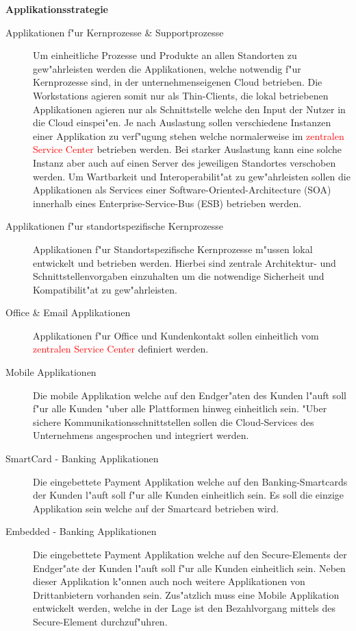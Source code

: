 \textbf{Applikationsstrategie}\\	

\begin{description}
	
	\item[Applikationen f"ur Kernprozesse \& Supportprozesse] Um einheitliche Prozesse und Produkte an allen Standorten zu gew"ahrleisten werden die Applikationen, welche notwendig f"ur Kernprozesse sind, in der unternehmenseigenen Cloud betrieben. Die Workstations agieren somit nur als Thin-Clients, die lokal betriebenen Applikationen agieren nur als Schnittstelle welche den Input der Nutzer in die Cloud einspei"en. Je nach Auslastung sollen verschiedene Instanzen einer Applikation zu verf"ugung stehen welche normalerweise im \textcolor{red}{zentralen Service Center} betrieben werden. Bei starker Auslastung kann eine solche Instanz aber auch auf einen Server des jeweiligen Standortes verschoben werden. Um Wartbarkeit und Interoperabilit"at zu gew"ahrleisten sollen die Applikationen als Services einer Software-Oriented-Architecture (SOA) innerhalb eines Enterprise-Service-Bus (ESB) betrieben werden. 
	 
	\item[Applikationen f"ur standortspezifische Kernprozesse] Applikationen f"ur Standortspezifische Kernprozesse m"ussen lokal entwickelt und betrieben werden. Hierbei sind zentrale Architektur- und Schnittstellenvorgaben einzuhalten um die notwendige Sicherheit und Kompatibilit"at zu gew"ahrleisten. 	
	
	\item[Office \& Email Applikationen] Applikationen f"ur Office und Kundenkontakt sollen einheitlich vom \textcolor{red}{zentralen Service Center} definiert werden.
	
	\item[Mobile Applikationen] Die mobile Applikation welche auf den Endger"aten des Kunden l"auft soll f"ur alle Kunden "uber alle Plattformen hinweg einheitlich sein. "Uber sichere Kommunikationsschnittstellen sollen die Cloud-Services des Unternehmens angesprochen und integriert werden.
	
	\item[SmartCard - Banking Applikationen] Die eingebettete Payment Applikation welche auf den Banking-Smartcards der Kunden l"auft soll f"ur alle Kunden einheitlich sein. Es soll die einzige Applikation sein welche auf der Smartcard betrieben wird.
	
	\item[Embedded - Banking Applikationen] Die eingebettete Payment Applikation welche auf den Secure-Elements der Endger"ate der Kunden l"auft soll f"ur alle Kunden einheitlich sein. Neben dieser Applikation k"onnen auch noch weitere Applikationen von Drittanbietern vorhanden sein. Zus"atzlich muss eine Mobile Applikation entwickelt werden, welche in der Lage ist den Bezahlvorgang mittels des Secure-Element durchzuf"uhren.

\end{description}

